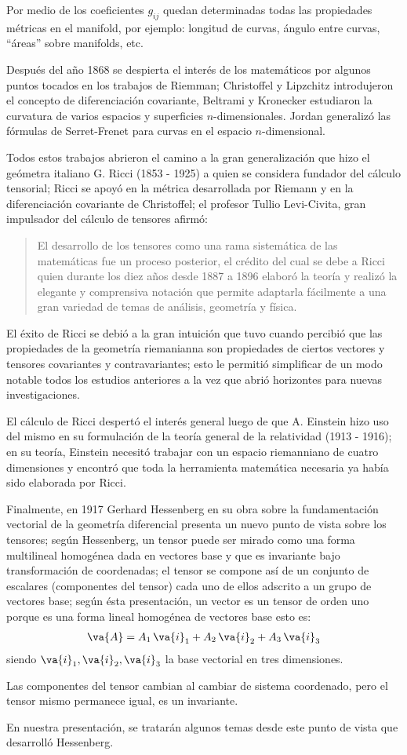 Por medio de los coeficientes $g_{ij}$ quedan determinadas todas las propiedades métricas en el manifold, por ejemplo: longitud de curvas, ángulo entre curvas, \enquote{áreas} sobre manifolds, etc.
\par
Después del año 1868 se despierta el interés de los matemáticos por algunos puntos tocados en los trabajos de Riemman; Christoffel y Lipzchitz introdujeron el concepto de diferenciación covariante, Beltrami y Kronecker estudiaron la curvatura de varios espacios y superficies $n$-dimensionales. Jordan generalizó las fórmulas de Serret-Frenet para curvas en el espacio $n$-dimensional.
\par
 Todos estos trabajos abrieron el camino a la gran generalización que hizo el geómetra italiano G. Ricci (1853 - 1925) a quien se considera fundador del cálculo tensorial; Ricci se apoyó en la métrica desarrollada por Riemann y en la diferenciación covariante de Christoffel; el profesor Tullio Levi-Civita, gran impulsador del cálculo de tensores afirmó: \blockquote{El desarrollo de los tensores como una rama sistemática de las matemáticas fue un proceso posterior, el crédito del cual se debe a Ricci quien durante los diez años desde 1887 a 1896 elaboró la teoría y realizó la elegante y comprensiva notación que permite adaptarla fácilmente a una gran variedad de temas de análisis, geometría y física.}
 \par
 El éxito de Ricci se debió a la gran intuición que tuvo cuando percibió que las propiedades de la geometría riemanianna son propiedades de ciertos vectores y tensores covariantes y contravariantes; esto le permitió simplificar de un modo notable todos los estudios anteriores a la vez que abrió horizontes para nuevas investigaciones.
 \par
El cálculo de Ricci despertó el interés general luego de que A. Einstein hizo uso del mismo en su formulación de la teoría general de la relatividad (1913 - 1916); en su teoría, Einstein necesitó trabajar con un espacio riemanniano de cuatro
dimensiones y encontró que toda la herramienta matemática necesaria ya había sido elaborada por Ricci.
\par
Finalmente, en 1917 Gerhard Hessenberg en su obra sobre la fundamentación vectorial de la geometría diferencial presenta un nuevo punto de vista sobre los tensores; según Hessenberg, un tensor puede ser mirado como una forma multilineal
homogénea dada en vectores base y que es invariante bajo transformación de coordenadas; el tensor se compone así de un conjunto de escalares (componentes del tensor) cada uno de ellos adscrito a un grupo de vectores base; según ésta presentación, un vector es un tensor de orden uno porque es una forma lineal homogénea de vectores base esto es:
\begin{align*}
\va{A} =  A_{1} \, \va{i}_{1} + A_{2} \, \va{i}_{2} + A_{3} \, \va{i}_{3}
\end{align*}
siendo $\va{i}_{1}, \va{i}_{2}, \va{i}_{3}$ la base vectorial en tres dimensiones.
\par
Las componentes del tensor cambian al cambiar de sistema coordenado, pero el tensor mismo permanece igual, es un invariante.
\par
En nuestra presentación, se tratarán algunos temas desde este punto de vista que desarrolló Hessenberg.
\newpage

